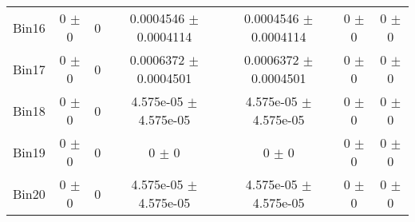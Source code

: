 \begin{tabular}{@{\extracolsep{4pt}}lcccccc@{}}
     Bin16 & 0 $\pm$ 0 & 0 & 0.0004546 $\pm$ 0.0004114 & 0.0004546 $\pm$ 0.0004114 & 0 $\pm$ 0 & 0 $\pm$ 0 \\ 
     Bin17 & 0 $\pm$ 0 & 0 & 0.0006372 $\pm$ 0.0004501 & 0.0006372 $\pm$ 0.0004501 & 0 $\pm$ 0 & 0 $\pm$ 0 \\ 
     Bin18 & 0 $\pm$ 0 & 0 & 4.575e-05 $\pm$ 4.575e-05 & 4.575e-05 $\pm$ 4.575e-05 & 0 $\pm$ 0 & 0 $\pm$ 0 \\ 
     Bin19 & 0 $\pm$ 0 & 0 & 0 $\pm$ 0 & 0 $\pm$ 0 & 0 $\pm$ 0 & 0 $\pm$ 0 \\ 
     Bin20 & 0 $\pm$ 0 & 0 & 4.575e-05 $\pm$ 4.575e-05 & 4.575e-05 $\pm$ 4.575e-05 & 0 $\pm$ 0 & 0 $\pm$ 0 \\ 
\hline\hline
  \end{tabular}
